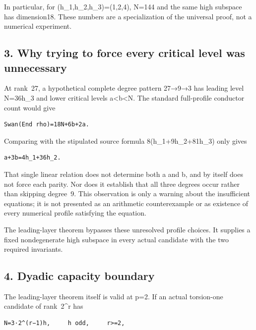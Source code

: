 In particular, for (h\_1,h\_2,h\_3)=(1,2,4), N=144 and the same high
subspace has dimension18. These numbers are a specialization of the
universal proof, not a numerical experiment.

\hypertarget{odd_capacity-why-trying-to-force-every-critical-level-was-unnecessary}{%
\subsection{3. Why trying to force every critical level was
unnecessary}\label{odd_capacity-why-trying-to-force-every-critical-level-was-unnecessary}}

At rank~27, a hypothetical complete degree pattern 27→9→3 has leading
level N=36h\_3 and lower critical levels a\textless b\textless N. The
standard full-profile conductor count would give

\begin{Verbatim}[fontsize=\small,breaklines=true,breakanywhere=true]
Swan(End rho)=18N+6b+2a.
\end{Verbatim}

Comparing with the stipulated source formula 8(h\_1+9h\_2+81h\_3) only
gives

\begin{Verbatim}[fontsize=\small,breaklines=true,breakanywhere=true]
a+3b=4h_1+36h_2.
\end{Verbatim}

That single linear relation does not determine both a and b, and by
itself does not force each parity. Nor does it establish that all three
degrees occur rather than skipping degree~9. This observation is only a
warning about the insufficient equations; it is not presented as an
arithmetic counterexample or as existence of every numerical profile
satisfying the equation.

The leading-layer theorem bypasses these unresolved profile choices. It
supplies a fixed nondegenerate high subspace in every actual candidate
with the two required invariants.

\hypertarget{odd_capacity-dyadic-capacity-boundary}{%
\subsection{4. Dyadic capacity
boundary}\label{odd_capacity-dyadic-capacity-boundary}}

The leading-layer theorem itself is valid at p=2. If an actual
torsion-one candidate of rank~2\^{}r has

\begin{Verbatim}[fontsize=\small,breaklines=true,breakanywhere=true]
N=3·2^(r−1)h,     h odd,     r>=2,
\end{Verbatim}

